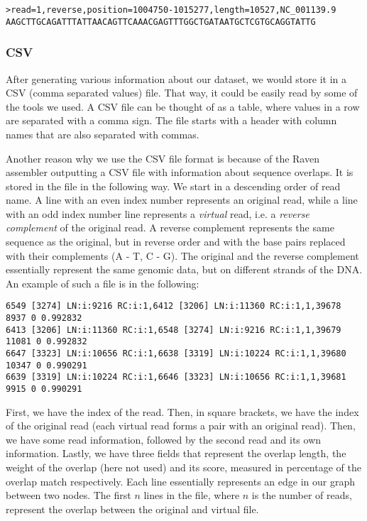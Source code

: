 \documentclass[times, utf8, diplomski, english]{fer_eng}
\begin{document}
\begin{lstlisting}
>read=1,reverse,position=1004750-1015277,length=10527,NC_001139.9
AAGCTTGCAGATTTATTAACAGTTCAAACGAGTTTGGCTGATAATGCTCGTGCAGGTATTG
\end{lstlisting}

\subsubsection{CSV}

After generating various information about our dataset, we would store it in a CSV (comma separated values) file. That way, it could be easily read by some of the tools we used. A CSV file can be thought of as a table, where values in a row are separated with a comma sign. The file starts with a header with column names that are also separated with commas.

Another reason why we use the CSV file format is because of the Raven assembler outputting a CSV file with information about sequence overlaps. It is stored in the file in the following way. We start in a descending order of read name. A line with an even index number represents an original read, while a line with an odd index number line represents a \textit{virtual} read, i.e. a \textit{reverse complement} of the original read. A reverse complement represents the same sequence as the original, but in reverse order and with the base pairs replaced with their complements (A - T, C - G). The original and the reverse complement essentially represent the same genomic data, but on different strands of the DNA. An example of such a file is in the following:

\begin{lstlisting}
6549 [3274] LN:i:9216 RC:i:1,6412 [3206] LN:i:11360 RC:i:1,1,39678 8937 0 0.992832
6413 [3206] LN:i:11360 RC:i:1,6548 [3274] LN:i:9216 RC:i:1,1,39679 11081 0 0.992832
6647 [3323] LN:i:10656 RC:i:1,6638 [3319] LN:i:10224 RC:i:1,1,39680 10347 0 0.990291
6639 [3319] LN:i:10224 RC:i:1,6646 [3323] LN:i:10656 RC:i:1,1,39681 9915 0 0.990291
\end{lstlisting}

First, we have the index of the read. Then, in square brackets, we have the index of the original read (each virtual read forms a pair with an original read). Then, we have some read information, followed by the second read and its own information. Lastly, we have three fields that represent the overlap length, the weight of the overlap (here not used) and its score, measured in percentage of the overlap match respectively. Each line essentially represents an edge in our graph between two nodes. The first $n$ lines in the file, where $n$ is the number of reads, represent the overlap between the original and virtual file.
\end{document}
